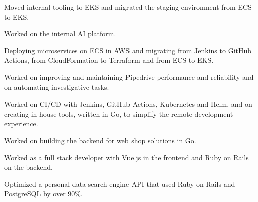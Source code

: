 \documentclass{awesome-cv}
\begin{document}
\bodystyle



\begin{cvitems}
  \item Moved internal tooling to EKS and migrated the staging environment from ECS to EKS.
  \item Worked on the internal AI platform.
\end{cvitems}
\begin{cvitems}
  \item Deploying microservices on ECS in AWS and migrating from Jenkins to GitHub Actions, from CloudFormation to Terraform and from ECS to EKS.
\end{cvitems}

\begin{cvitems}
  \item Worked on improving and maintaining Pipedrive performance and reliability and on automating investigative tasks.
\end{cvitems}
\begin{cvitems}
  \item Worked on CI/CD with Jenkins, GitHub Actions, Kubernetes and Helm, and on creating in-house tools, written in Go, to simplify the remote development experience.
\end{cvitems}

\begin{cvitems}
  \item Worked on building the backend for web shop solutions in Go.
\end{cvitems}

\begin{cvitems}
  \item Worked as a full stack developer with Vue.js in the frontend and Ruby on Rails on the backend.
  \item Optimized a personal data search engine API that used Ruby on Rails and PostgreSQL by over 90\%.
\end{cvitems}
\end{document}
